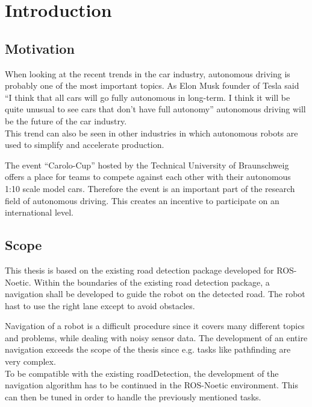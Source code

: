 \chapter{Introduction}
\label{introduction}


\section{Motivation}
When looking at the recent trends in the car industry, autonomous driving is probably one of the most important topics. As Elon Musk founder of Tesla said ``I think that all cars will go fully autonomous in long-term. I think it will be quite unusual to see cars that don’t have full autonomy'' autonomous driving will be the future of the car industry\cite{musk}.\\

This trend can also be seen in other industries in which autonomous robots are used to simplify and accelerate production. 

The event ``Carolo-Cup'' hosted by the Technical University of Braunschweig offers a place for teams to compete against each other with their autonomous 1:10 scale model cars. Therefore the event is an important part of the research field of autonomous driving. This creates an incentive to participate on an international level.

\section{Scope}

This thesis is based on the existing road detection package developed for ROS-Noetic. Within the boundaries of the existing road detection package, a navigation shall be developed to guide the robot on the detected road. The robot hast to use the right lane except to avoid obstacles.

Navigation of a robot is a difficult procedure since it covers many different topics and problems, while dealing with noisy sensor data. The development of an entire navigation exceeds the scope of the thesis since e.g. tasks like pathfinding are very complex.\\

To be compatible with the existing roadDetection, the development of the navigation algorithm has to be continued in the ROS-Noetic environment. This can then be tuned in order to handle the previously mentioned tasks.\\

